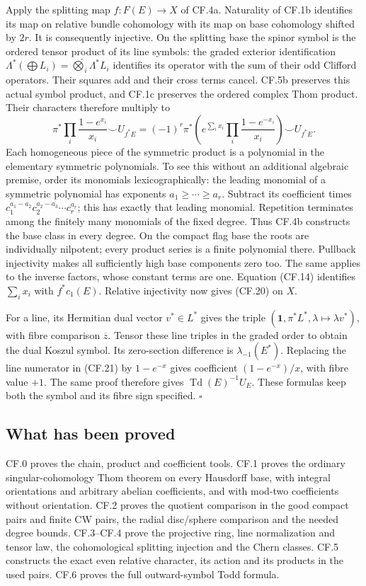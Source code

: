 \documentclass[
  11pt,
]{article}
\begin{document}
Apply the splitting map \(f:F(E)\to X\) of CF.4a. Naturality of CF.1b
identifies its map on relative bundle cohomology with its map on base
cohomology shifted by \(2r\). It is consequently injective. On the
splitting base the spinor symbol is the ordered tensor product of its
line symbols: the graded exterior identification
\(\Lambda^*(\bigoplus L_i)=\widehat\bigotimes_i\Lambda^*L_i\) identifies
its operator with the sum of their odd Clifford operators. Their squares
add and their cross terms cancel. CF.5b preserves this actual symbol
product, and CF.1c preserves the ordered complex Thom product. Their
characters therefore multiply to \[
\pi^*\prod_i\frac{1-e^{x_i}}{x_i}\smile U_{f^*E}
=(-1)^r\pi^*\!\left(e^{\sum_i x_i}\prod_i\frac{1-e^{-x_i}}{x_i}\right)\smile U_{f^*E}.
\] Each homogeneous piece of the symmetric product is a polynomial in
the elementary symmetric polynomials. To see this without an additional
algebraic premise, order its monomials lexicographically: the leading
monomial of a symmetric polynomial has exponents
\(a_1\geq\cdots\geq a_r\). Subtract its coefficient times
\(c_1^{a_1-a_2}c_2^{a_2-a_3}\cdots c_r^{a_r}\); this has exactly that
leading monomial. Repetition terminates among the finitely many
monomials of the fixed degree. Thus CF.4b constructs the base class in
every degree. On the compact flag base the roots are individually
nilpotent; every product series is a finite polynomial there. Pullback
injectivity makes all sufficiently high base components zero too. The
same applies to the inverse factors, whose constant terms are one.
Equation (CF.14) identifies \(\sum_i x_i\) with \(f^*c_1(E)\). Relative
injectivity now gives (CF.20) on \(X\).

For a line, its Hermitian dual vector \(v^*\in L^*\) gives the triple
\((\mathbf1,\pi^*L^*,\lambda\mapsto\lambda v^*)\), with fibre comparison
\(\overline z\). Tensor these line triples in the graded order to obtain
the dual Koszul symbol. Its zero-section difference is
\(\lambda_{-1}(E^*)\). Replacing the line numerator in (CF.21) by
\(1-e^{-x}\) gives coefficient \((1-e^{-x})/x\), with fibre value
\(+1\). The same proof therefore gives \(\operatorname{Td}(E)^{-1}U_E\).
These formulas keep both the symbol and its fibre sign specified.
\(\square\)

\subsection{What has been proved}\label{what-has-been-proved}

CF.0 proves the chain, product and coefficient tools. CF.1 proves the
ordinary singular-cohomology Thom theorem on every Hausdorff base, with
integral orientations and arbitrary abelian coefficients, and with
mod-two coefficients without orientation. CF.2 proves the quotient
comparison in the good compact pairs and finite CW pairs, the radial
disc/sphere comparison and the needed degree bounds. CF.3--CF.4 prove
the projective ring, line normalization and tensor law, the
cohomological splitting injection and the Chern classes. CF.5 constructs
the exact even relative character, its action and its products in the
used pairs. CF.6 proves the full outward-symbol Todd formula.
\end{document}
